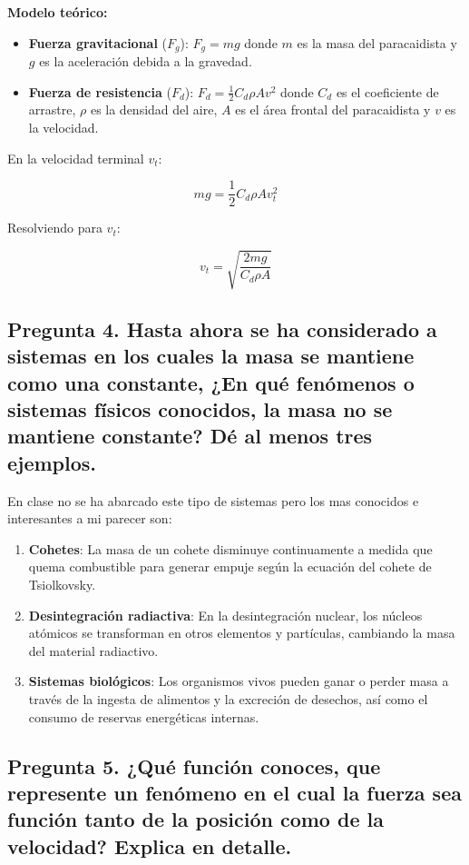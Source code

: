 \documentclass{article}
\begin{document}
\textbf{Modelo teórico:}

\begin{itemize}
    \item \textbf{Fuerza gravitacional} ($ F_g $): $ F_g = mg $ donde $ m $ es la masa del paracaidista y $ g $ es la aceleración debida a la gravedad.
    \item \textbf{Fuerza de resistencia} ($ F_d $): $ F_d = \frac{1}{2} C_d \rho A v^2 $ donde $ C_d $ es el coeficiente de arrastre, $ \rho $ es la densidad del aire, $ A $ es el área frontal del paracaidista y $ v $ es la velocidad.
\end{itemize}

En la velocidad terminal $ v_t $:

\[ mg = \frac{1}{2} C_d \rho A v_t^2 \]

Resolviendo para $ v_t $:

\[ v_t = \sqrt{\frac{2mg}{C_d \rho A}} \]

\subsection*{Pregunta 4. Hasta ahora se ha considerado a sistemas en los cuales la masa se mantiene como una constante, ¿En qué fenómenos o sistemas físicos conocidos, la masa no se mantiene constante? Dé al menos tres ejemplos.}
En clase no se ha abarcado este tipo de sistemas pero los mas conocidos e interesantes a mi parecer son:

\begin{enumerate}
    \item \textbf{Cohetes}: La masa de un cohete disminuye continuamente a medida que quema combustible para generar empuje según la ecuación del cohete de Tsiolkovsky.
    \item \textbf{Desintegración radiactiva}: En la desintegración nuclear, los núcleos atómicos se transforman en otros elementos y partículas, cambiando la masa del material radiactivo.
    \item \textbf{Sistemas biológicos}: Los organismos vivos pueden ganar o perder masa a través de la ingesta de alimentos y la excreción de desechos, así como el consumo de reservas energéticas internas.
\end{enumerate}

\subsection*{Pregunta 5. ¿Qué función conoces, que represente un fenómeno en el cual la fuerza sea función tanto de la posición como de la velocidad? Explica en detalle.}
\end{document}
